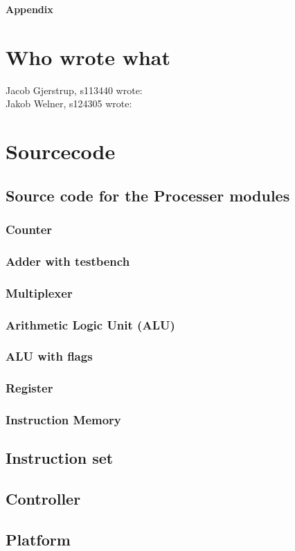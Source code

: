 \documentclass[12pt,a4paper]{article}
\begin{document}
\newpage	
	\begin{Large}
		\textbf{Appendix}
	\end{Large}
	\appendix

\section{Who wrote what}
Jacob Gjerstrup, s113440 wrote: \\
Jakob Welner, s124305 wrote: \\

\section{Sourcecode}

\subsection{Source code for the Processer modules}
	\subsubsection{Counter}
			
	\subsubsection{Adder with testbench}
			
	\subsubsection{Multiplexer}
			
	\subsubsection{Arithmetic Logic Unit (ALU)}
		
	\subsubsection{ALU with flags}
			
	\subsubsection{Register}
			
	\subsubsection{Instruction Memory}
			
\subsection{Instruction set}
		
\subsection{Controller}
\subsection{Platform}
		
\end{document}
